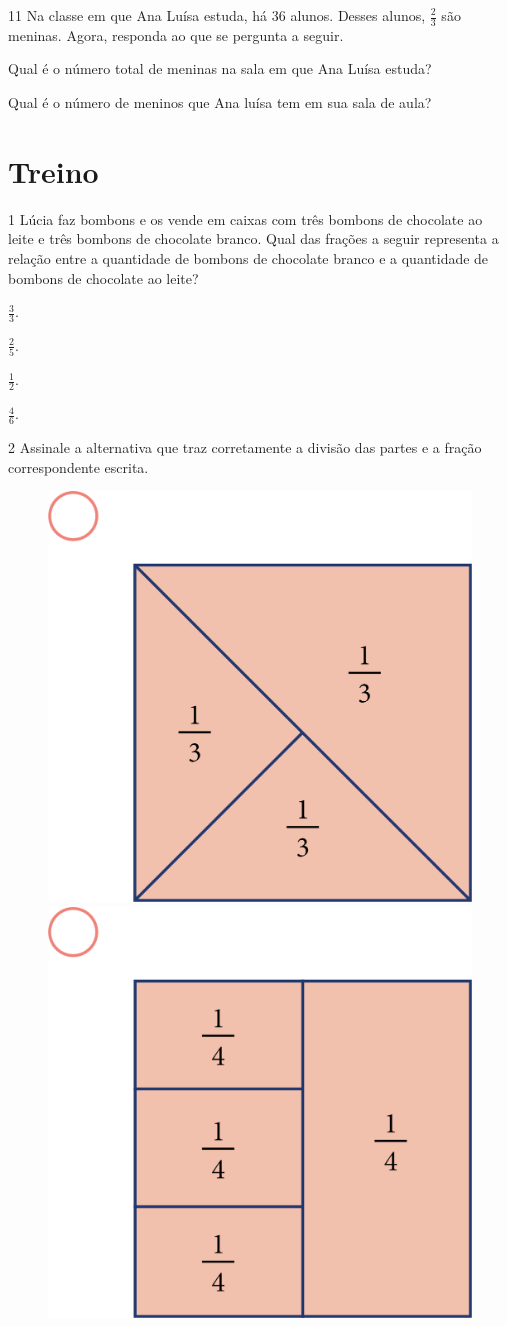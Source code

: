 \num{11} Na classe em que Ana Luísa estuda, há 36 alunos. Desses alunos, $\frac{2}{3}$
são meninas. Agora, responda ao que se pergunta a seguir.

\begin{escolha}
\item
  Qual é o número total de meninas na sala em que Ana Luísa estuda?


\item
  Qual é o número de meninos que Ana luísa tem em sua sala de aula?

\end{escolha}

\section{Treino}

\num{1} Lúcia faz bombons e os vende em caixas com três bombons de chocolate ao leite e três bombons de chocolate branco. Qual das frações a seguir representa a relação entre a quantidade de
bombons de chocolate branco e a quantidade de bombons de chocolate ao leite?

\begin{multicols}{2}
\begin{escolha}
\item
  $\frac{3}{3}$.

\item
  $\frac{2}{5}$.

\item
  $\frac{1}{2}$.

\item
  $\frac{4}{6}$.
\end{escolha}
\end{multicols}

\pagebreak
\num{2} Assinale a alternativa que traz corretamente a divisão das partes e a
fração correspondente escrita.

\begin{figure}[htpb!]
\includegraphics[width=.3\textwidth]{media/image66.png}
\includegraphics[width=.3\textwidth]{media/image67.png}
\end{figure}

